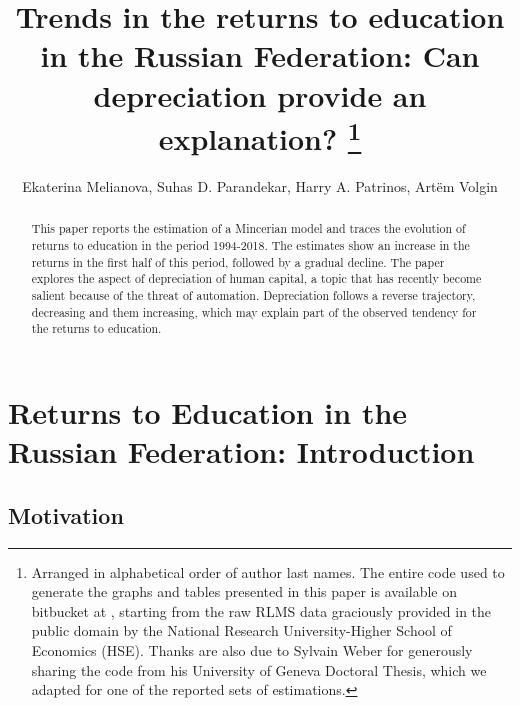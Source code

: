 \documentclass[12pt,a4paper]{article}
\numberwithin{equation}{section}
\begin{document}
\title{Trends in the returns to education in the Russian Federation: Can depreciation provide an explanation? \footnote{Arranged in alphabetical order of author last names. The entire code used to generate the graphs and tables presented in this paper is available on bitbucket at  , starting from the raw RLMS data graciously provided in the public domain by the National Research University-Higher School of Economics (HSE). Thanks are also due to Sylvain Weber for generously sharing the code from his University of Geneva Doctoral Thesis, which we adapted for one of the reported sets of estimations.}}
\author{Ekaterina Melianova, Suhas D. Parandekar, Harry A. Patrinos, Art\"{e}m Volgin}
\maketitle

\begin{abstract}
This paper reports the estimation of a Mincerian model and traces the evolution of returns to education in the period 1994-2018. The estimates show an increase in the returns in the first half of this period, followed by a gradual decline. The paper explores the aspect of depreciation of human capital, a topic that has recently become salient because of the threat of automation. Depreciation follows a reverse trajectory, decreasing and them increasing, which may explain part of the observed tendency for the returns to education. 
\end{abstract}

\section{Returns to Education in the Russian Federation: Introduction}

\subsection{Motivation}
\end{document}
